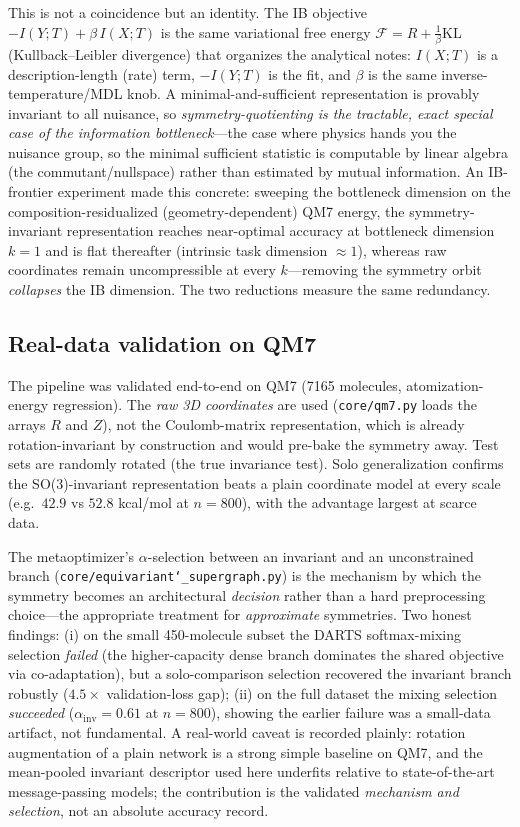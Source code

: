 \documentclass[11pt]{article}
\newcommand{\allowbreakhere}{\discretionary{}{}{}}
\newcommand{\code}[1]{\texttt{\def\_{\char`_\allowbreakhere}#1}}
\begin{document}
This is not a coincidence but an identity. The IB objective $-I(Y;T)+\beta\,I(X;T)$ is the same
variational free energy $\mathcal{F}=R+\tfrac{1}{\beta}\mathrm{KL}$ (Kullback--Leibler divergence) that organizes the analytical
notes: $I(X;T)$ is a description-length (rate) term, $-I(Y;T)$ is the fit, and $\beta$ is the same
inverse-temperature/MDL knob. A minimal-and-sufficient representation is provably invariant to all
nuisance, so \emph{symmetry-quotienting is the tractable, exact special case of the information
bottleneck}---the case where physics hands you the nuisance group, so the minimal sufficient
statistic is computable by linear algebra (the commutant/nullspace) rather than estimated by mutual
information. An IB-frontier experiment made this concrete: sweeping the bottleneck dimension on the
composition-residualized (geometry-dependent) QM7 energy, the symmetry-invariant representation
reaches near-optimal accuracy at bottleneck dimension $k{=}1$ and is flat thereafter (intrinsic task
dimension $\approx 1$), whereas raw coordinates remain uncompressible at every $k$---removing the
symmetry orbit \emph{collapses} the IB dimension. The two reductions measure the same redundancy.

\subsection{Real-data validation on QM7}
\label{sec:qm7validation}

The pipeline was validated end-to-end on QM7 (7165 molecules, atomization-energy regression). The
\emph{raw 3D coordinates} are used (\code{core/qm7.py} loads the arrays $R$ and $Z$), not the
Coulomb-matrix representation, which is already rotation-invariant by construction and would
pre-bake the symmetry away. Test sets are randomly rotated (the true invariance test). Solo
generalization confirms the SO(3)-invariant representation beats a plain coordinate model at every
scale (e.g.\ $42.9$ vs $52.8$ kcal/mol at $n{=}800$), with the advantage largest at scarce data.

The metaoptimizer's $\alpha$-selection between an invariant and an unconstrained branch
(\code{core/equivariant\_supergraph.py}) is the mechanism by which the symmetry becomes an
architectural \emph{decision} rather than a hard preprocessing choice---the appropriate treatment
for \emph{approximate} symmetries. Two honest findings: (i) on the small 450-molecule subset the
DARTS softmax-mixing selection \emph{failed} (the higher-capacity dense branch dominates the shared
objective via co-adaptation), but a solo-comparison selection recovered the invariant branch
robustly ($4.5\times$ validation-loss gap); (ii) on the full dataset the mixing selection
\emph{succeeded} ($\alpha_{\mathrm{inv}}=0.61$ at $n{=}800$), showing the earlier failure was a
small-data artifact, not fundamental. A real-world caveat is recorded plainly: rotation
augmentation of a plain network is a strong simple baseline on QM7, and the mean-pooled invariant
descriptor used here underfits relative to state-of-the-art message-passing models; the contribution
is the validated \emph{mechanism and selection}, not an absolute accuracy record.
\end{document}
